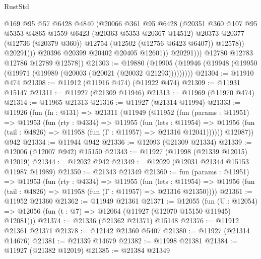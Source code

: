 \begin{lexlean}{RustStd}
\begin{coremodule}
                        @169
                        @95
                        @57
                        @6428
                        @4840
                        (@20066
                          @361
                          @95
                          @6428
                          (@20351
                            @360
                            @107
                            @95
                            @5353
                            @4865
                            @1559
                            @6423
                            (@20363 @5353 @20367 @14512)
                            @20373
                            @20377
                            (@12736 (@20379 @360))
                            @12754
                            (@12502 (@12756 @6423 @6407))
                            @12578))
                        @20291)))
                  @20396
                  @20399
                  @20402
                  @20405
                  @12601))
              @20291)))
        @12780
        @12783
        @12786
        @12789
        @12578))
@21303 := @19880
    (@19905 (@19946 (@19948 (@19950 (@19971 (@19989 (@20003 (@20021 (@20032 @21293)))))))))
@21304 := @11910 @474
@21308 := @11912 (@11916 @474) (@11922 @474)
@21309 := @11931 @15147
@21311 := @11927 (@21309 @11946)
@21313 := @11969 (@11970 @474)
@21314 := @11965 @21313
@21316 := @11927 (@21314 @11994)
@21333 := @11926
    (fun (fn : @131) =>
    @21311
      (@11949
        (@11952
          (fun (params : @11951) =>
          @11953
            (fun (rty : @4334) =>
            @11955
              (fun (lets : @11954) =>
              @11956 (fun (tail : @4826) => @11958 (fun (Γ : @11957) => @21316 @12041))))))
        @12087))
    @942
@21334 := @11944 @942
@21336 := @12093 (@21309 @21334)
@21339 := @12006 (@12007 @942) @15150
@21343 := @11927 (@11998 (@21339 @12015) @12019)
@21344 := @12032 @942
@21349 := @12029 (@12031 @21344 @15153 @11987 @11989)
@21350 := @21343 @21349
@21360 := fun (params : @11951) =>
  @11953
    (fun (rty : @4334) =>
    @11955
      (fun (lets : @11954) =>
      @11956 (fun (tail : @4826) => @11958 (fun (Γ : @11957) => @21316 @21350))))
@21361 := @11952 @21360
@21362 := @11949 @21361
@21371 := @12055
    (fun (U : @12054) => @12056 (fun (t : @7) => @12064 (@11927 (@12070 @15150 @11945) @12081)))
@21374 := @21336 (@21362 @21371) @15148
@21376 := @11912 @21361 @21371
@21378 := @12142 @21360 @5407
@21380 := @11927 (@21314 @14676)
@21381 := @21339 @14679
@21382 := @11998 @21381
@21384 := @11927 (@21382 @12019)
@21385 := @21384 @21349

\end{coremodule}
\end{lexlean}
